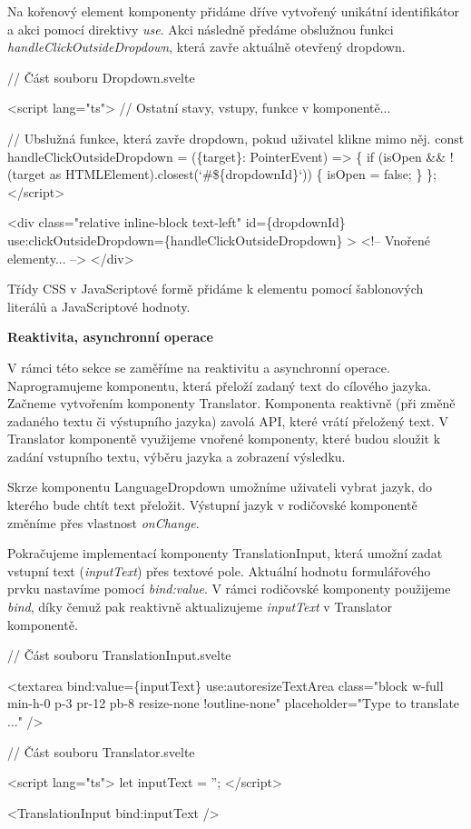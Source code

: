 Na kořenový element komponenty přidáme dříve vytvořený unikátní identifikátor a akci pomocí direktivy \emph{use}. 
Akci následně předáme obslužnou funkci \emph{handleClickOutsideDropdown}, která zavře aktuálně otevřený dropdown.

\begin{prog}
// Část souboru Dropdown.svelte

<script lang="ts">
  // Ostatní stavy, vstupy, funkce v komponentě...

  // Ubslužná funkce, která zavře dropdown, pokud uživatel klikne mimo něj.
  const handleClickOutsideDropdown = (\{target\}: PointerEvent) => \{
    if (isOpen && !(target as HTMLElement).closest(`#\$\{dropdownId\}`)) \{
      isOpen = false;
    \}
  \};
</script>
  
<div
  class="relative inline-block text-left"
  id=\{dropdownId\}
  use:clickOutsideDropdown=\{handleClickOutsideDropdown\}
>
  <!-- Vnořené elementy... -->
</div>
\end{prog}

Třídy CSS v JavaScriptové formě přidáme k elementu pomocí šablonových literálů a JavaScriptové hodnoty.

\begin{flushleft}
  \textbf{Reaktivita, asynchronní operace}
\end{flushleft}

V rámci této sekce se zaměříme na reaktivitu a asynchronní operace. Naprogramujeme komponentu, která přeloží zadaný text do cílového jazyka. 
Začneme vytvořením komponenty Translator. Komponenta reaktivně (při změně zadaného textu či výstupního jazyka) zavolá API, které vrátí přeložený text. 
V Translator komponentě využijeme vnořené komponenty, které budou sloužit k zadání vstupního textu, výběru jazyka a zobrazení výsledku.

Skrze komponentu LanguageDropdown umožníme uživateli vybrat jazyk, do kterého bude chtít text přeložit. Výstupní jazyk v rodičovské komponentě změníme přes vlastnost \emph{onChange}.

Pokračujeme implementací komponenty TranslationInput, která umožní zadat vstupní text (\emph{inputText}) přes textové pole. Aktuální hodnotu formulářového prvku nastavíme pomocí \emph{bind:value}. 
V rámci rodičovské komponenty použijeme \emph{bind}, díky čemuž pak reaktivně aktualizujeme \emph{inputText} v Translator komponentě.

\begin{prog}
// Část souboru TranslationInput.svelte

<textarea
  bind:value=\{inputText\}
  use:autoresizeTextArea
  class="block w-full min-h-0 p-3 pr-12 pb-8 resize-none !outline-none"
  placeholder="Type to translate ..."
/>

// Část souboru Translator.svelte

<script lang="ts">
  let inputText = '';
</script>

<TranslationInput bind:inputText />
\end{prog}

